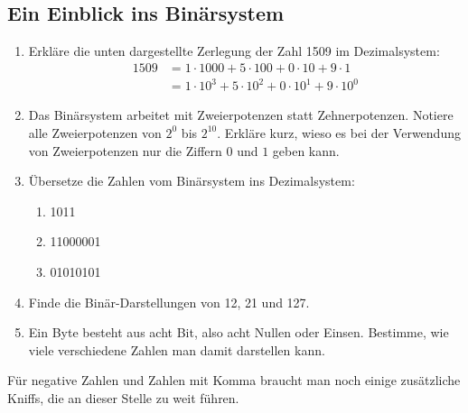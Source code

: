 \subsection{Ein Einblick ins Binärsystem}\label{sec:binaer}

\begin{aufgabe}
	\begin{enumerate}[label=\alph*), noitemsep]
		\item Erkläre die unten dargestellte Zerlegung der Zahl 1509 im Dezimalsystem:
		\vspace{-0.5\baselineskip}
		\begin{align*}
		1509 &= 1\cdot 1000 + 5 \cdot 100 + 0\cdot 10 + 9 \cdot 1 \\
		&= 1\cdot 10^3+ 5\cdot 10^2 + 0 \cdot 10^1 + 9 \cdot 10^0
		\end{align*}
		\vspace{-1.5\baselineskip}
		\item Das Binärsystem arbeitet mit Zweierpotenzen statt Zehnerpotenzen. Notiere alle Zweierpotenzen von $2^0$ bis $2^{10}$. Erkläre kurz, wieso es bei der Verwendung von Zweierpotenzen nur die Ziffern $0$ und $1$ geben kann.
		\item Übersetze die Zahlen vom Binärsystem ins Dezimalsystem:
		\vspace{-0.5\baselineskip}
		\begin{multicols}{3}
			\begin{enumerate}[label=(\arabic*),noitemsep]
				\item 1011
				\item 11000001
				\item 01010101
			\end{enumerate}
		\end{multicols}
		\vspace{-0.5\baselineskip}
		\item Finde die Binär-Darstellungen von 12, 21 und 127.
		\item Ein Byte besteht aus acht Bit, also acht Nullen oder Einsen. Bestimme, wie viele verschiedene Zahlen man damit darstellen kann.
	\end{enumerate}
\end{aufgabe}

Für negative Zahlen und Zahlen mit Komma braucht man noch einige zusätzliche Kniffs, die an dieser Stelle zu weit führen.

